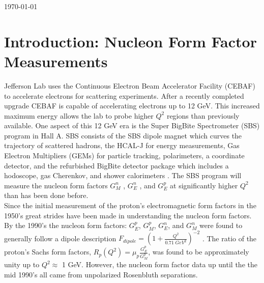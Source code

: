 \documentclass[oneside]{book}   %
\newcommand{\hcal}{HCAL-J\xspace}
\newcommand{\jlab}{Jefferson Lab\xspace}
\newcommand{\q}{$Q^2$\xspace}
\begin{document}
\begin{titlepage}
	\vfill\vfill\vfill %
	
	{\large\today} %
	
	
	 
	
	\vfill %
	
\end{titlepage}

\tableofcontents
 
\mainmatter
 
\chapter{Introduction: Nucleon Form Factor Measurements}
\label{intro}

\jlab uses the Continuous Electron Beam Accelerator Facility (CEBAF) to accelerate electrons for scattering experiments. After a recently completed upgrade CEBAF is capable of accelerating electrons up to 12 GeV. This increased maximum energy allows the lab to probe higher \q regions than previously available. One aspect of this 12 GeV era is the Super BigBite Spectrometer (SBS) program in Hall A. SBS consists of the SBS dipole magnet which curves the trajectory of scattered hadrons, the \hcal for energy measurements, Gas Electron Multipliers (GEMs) for particle tracking, polarimeters, a coordinate detector, and the refurbished BigBite detector package which includes a hodoscope, gas Cherenkov, and shower calorimeters \cite{brio_2018}. The SBS program will measure the nucleon form factors $G_M^n$ \cite{gmn_proposal}, $G_E^n$ \cite{gen_proposal}, and $G_E^p$ \cite{gep_proposal} at significantly higher \q than has been done before. \\

Since the initial measurement of the proton's electromagnetic form factors in the 1950's \cite{hofstadter_1956} great strides have been made in understanding the nucleon form factors. By the 1990's the nucleon form factors: $G_E^p$, $G_M^p$, $G_E^n$, and $G_M^n$ were found to generally follow a dipole description $F_{dipole} = \left( 1+\frac{Q^2}{0.71 \;GeV^2}\right)^{-2}$ \cite{bosted_1995}. The ratio of the proton's Sachs form factors, $R_p(Q^2) = \mu_{p}\frac{G_E^p}{G_M^p}$, was found to be approximately unity up to \q $\approx$ 1 GeV. However, the nucleon form factor data up until the the mid 1990's all came from unpolarized Rosenbluth separations.\\
\end{document}
